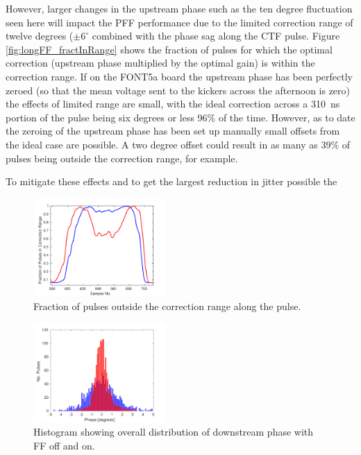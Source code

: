 However, larger changes in the upstream phase such as the ten degree fluctuation seen here will impact the PFF performance due to the limited correction range of twelve degrees (\(\pm6^\circ\) combined with the phase sag along the CTF pulse. Figure \ref{fig:longFF_fractInRange} shows the fraction of pulses for which the optimal correction (upstream phase multiplied by the optimal gain) is within the correction range. If on the FONT5a board the upstream phase has been perfectly zeroed (so that the mean voltage sent to the kickers across the afternoon is zero) the effects of limited range are small, with the ideal correction across a 310~ns portion of the pulse being six degrees or less 96\% of the time. However, as to date the zeroing of the upstream phase has been set up manually small offsets from the ideal case are possible. A two degree offset could result in as many as 39\% of pulses being outside the correction range, for example. 

To mitigate these effects and to get the largest reduction in jitter possible the  

\begin{figure}
  \centering
  \includegraphics[width=0.45\textwidth]{Figures/feedforward/longFF_fractInRange}
  \caption{Fraction of pulses outside the correction range along the pulse.}
  \label{f:longFF_fractInRange}
\end{figure}


\begin{figure}
  \centering
  \includegraphics[width=0.45\textwidth]{Figures/feedforward/longFF_histDownstreamPhase}
  \caption{Histogram showing overall distribution of downstream phase with FF off and on.}
  \label{f:longFF_histDownstreamPhase}
\end{figure}

